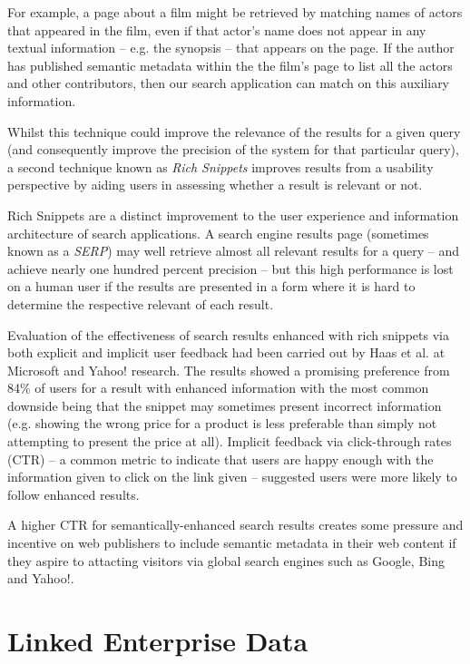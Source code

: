 For example, a page about a film might be retrieved
by matching names of actors that appeared in the film, even if that actor's
name does not appear in any textual information -- e.g. the synopsis --
that appears on the page. If the author has published semantic metadata
within the the film's page to list all the actors and other contributors,
then our search application can match on this auxiliary information.

Whilst this technique could improve the relevance of the results for a
given query (and consequently improve the precision of the system for that
particular query), a second technique known as \emph{Rich Snippets} improves
results from a usability perspective by aiding users in assessing whether
a result is relevant or not.

Rich Snippets are a distinct improvement 
to the user experience and information architecture
of search applications. A search engine results page (sometimes known as a
\emph{SERP}) may well retrieve almost all relevant results for a query -- and
achieve nearly one hundred percent precision -- but this high performance
is lost on a human user if the results are presented in a form where it is
hard to determine the respective relevant of each result.

Evaluation of the effectiveness of search results enhanced with rich snippets
via both explicit and implicit user feedback had been carried out by
Haas et al.\cite{haas2011enhanced} at Microsoft and Yahoo! research. The
results showed a promising preference from 84\% of users for a result
with enhanced information with the most common downside being that the
snippet may sometimes present incorrect information (e.g. showing the wrong
price for a product is less preferable than simply not attempting to present
the price at all). Implicit feedback via click-through rates (CTR) --
a common metric to indicate that users are happy enough with the information
given to click on the link given -- suggested users were more likely to
follow enhanced results.

A higher CTR for semantically-enhanced search results creates some pressure
and incentive on web publishers to include semantic metadata in their web
content if they aspire to attacting visitors via global search engines such
as Google, Bing and Yahoo!.

\section{Linked Enterprise Data}
\label{linked-enterprise-data}

